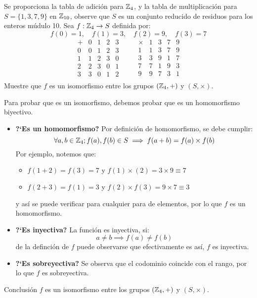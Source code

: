 \begin{fmd-example}
	Se proporciona la tabla de adición para $\mathbb{Z}_4$, y la tabla de multiplicación para $S=\{ 1, 3, 7, 9 \}$ en $\mathbb{Z}_{10}$, observe que $S$ es un conjunto reducido de residuos para los enteros múdulo 10. Sea $f: \mathbb{Z}_4 \rightarrow S$ definida por:
	\[ f(0) = 1, \quad f(1) = 3, \quad f(2) = 9, \quad f(3) = 7 \]
		\[ \begin{array}{c|cccc}
			+ & 0 & 1 & 2 & 3 \\ \hline
			0 & 0 & 1 & 2 & 3\\
			1 & 1 & 2 & 3 & 0\\
			2 & 2 & 3 & 0 & 1\\
			3 & 3 & 0 & 1 & 2\\
		\end{array} \qquad 	\begin{array}{c|cccc}
		\times & 1 & 3 & 7 & 9 \\ \hline
		1 & 1 & 3 & 7 & 9\\
		3 & 3 & 9 & 1 & 7\\
		7 & 7 & 1 & 9 & 3\\
		9 & 9 & 7 & 3 & 1\\
		\end{array} \]
	Muestre que $f$ es un isomorfismo entre los grupos $(\mathbb{Z}_4, +)$ y $(S, \times)$.
	
	Para probar que es un isomorfismo, debemos probar que es un homomorfismo biyectivo.
	
	\begin{itemize}
		\item \textbf{?`Es un homomorfismo?}
		Por definición de homomorfismo, se debe cumplir:
		\[ \forall a, b \in \mathbb{Z}_4; f(a), f(b) \in S \implies f(a + b) = f(a) \times f(b) \]
		Por ejemplo, notemos que:
		\begin{itemize}
			\item $ f(1 + 2) = f(3) = 7 $ y $f(1) \times (2) = 3 \times 9 \equiv 7$
			\item $f(2 + 3) = f(1) = 3$ y $f(2) \times f(3) = 9 \times 7 \equiv 3$
		\end{itemize}
		y así se puede verificar para cualquier para de elementos, por lo que $f$ es un homomorfismo.
		
		\item \textbf{?`Es inyectiva?}
		La función es inyectiva, si:
		\[ a \ne b \implies f(a) \ne f(b) \]
		de la definción de $f$ puede observarse que efectivamente es así, $f$ es inyectiva.
		
		\item \textbf{?`Es sobreyectiva?}
		Se observa que el codominio coincide con el rango, por lo que $f$ es sobreyectiva.		
	\end{itemize}
	Conclusión $f$ es un isomorfismo entre los grupos $(\mathbb{Z}_4, +)$ y $(S, \times)$.
\end{fmd-example}

